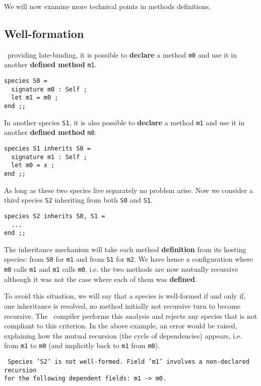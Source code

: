 We will now examine more technical points in methods definitions.



\subsection{Well-formation}
\focal\ providing late-binding, it is possible to {\bf declare} a
method {\tt m0} and use it in another {\bf defined method} {\tt m1}.

{\scriptsize
\begin{lstlisting}
species S0 =
  signature m0 : Self ;
  let m1 = m0 ;
end ;;
\end{lstlisting}
}

In another species {\tt S1}, it is also possible to {\bf declare} a
method {\tt m1} and use it in another {\bf defined method} {\tt m0}.
{\scriptsize
\begin{lstlisting}
species S1 inherits S0 =
  signature m1 : Self ;
  let m0 = x ;
end ;;
\end{lstlisting}
}

As long as these two species live separately no problem arise. Now we
consider a third species {\tt S2} inheriting from both {\tt S0} and
{\tt S1}.
{\scriptsize
\begin{lstlisting}
species S2 inherits S0, S1 =
  ...
end ;;
\end{lstlisting}
}

The inheritance mechanism will take each method {\bf definition} from
its hosting species: from {\tt S0} for {\tt m1} and from {\tt S1} for
{\tt m2}. We have hence a configuration where {\tt m0} calls {\tt m1}
and {\tt m1} calls {\tt m0}, i.e. the two methods are now mutually
recursive although it was not the case where each of them was
{\bf defined}.

To avoid this situation, we will say that a species is well-formed if
and only if, one inheritance is resolved, no method initially not
recursive turn to become recursive. The \focal\ compiler performs this
analysis and rejects any species that is not compliant to this
criterion. In the above example, an error would be raised, explaining
how the mutual recursion (the cycle of dependencies) appears,
i.e. from {\tt m1} to {\tt m0} (and implicitly back to {\tt m1} from
{\tt m0}).

\noindent
{\scriptsize
{\tt
Species 'S2' is not well-formed. Field
'm1' involves a non-declared recursion\\
for the following dependent fields: m1 -> m0.
}
}



